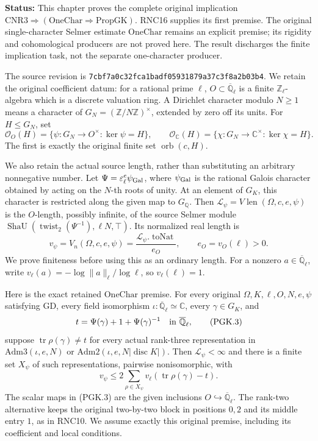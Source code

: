 \documentclass[11pt,a4paper]{article}
\numberwithin{equation}{section}
\theoremstyle{remark}\newtheorem{remark}[theorem]{Remark}
\newcommand{\status}[1]{\textbf{Status:} #1}
\begin{document}
\status{This chapter proves the complete original implication
\(\mathrm{CNR3}\Longrightarrow(\mathrm{OneChar}\Longrightarrow
\mathrm{PropGK})\). RNC16 supplies its first premise. The original
single-character Selmer estimate \(\mathrm{OneChar}\) remains an
explicit premise; its rigidity and cohomological producers are not
proved here. The result discharges the finite implication task,
not the separate one-character producer.}

The source revision is
\texttt{7cbf7a0c32fca1badf05931879a37c3f8a2b03b4}.
We retain the original coefficient datum: for a rational prime
\(\ell\), \(O\subset\overline{\mathbb Q}_\ell\) is a finite
\(\mathbb Z_\ell\)-algebra which is a discrete valuation ring.
A Dirichlet character modulo \(N\ge1\) means a character of
\(G_N=(\mathbb Z/N\mathbb Z)^\times\), extended by zero off its
units. For \(H\le G_N\), set
\[
 \mathcal O_O(H)=\{\psi:G_N\to O^\times:\ker\psi=H\},\qquad
 \mathcal O_{\mathbb C}(H)=
       \{\chi:G_N\to\mathbb C^\times:\ker\chi=H\}.
 \tag{PGK.1}
\]
The first is exactly the original finite set \(\operatorname{orb}(c,H)\).

We also retain the actual source length, rather than substituting
an arbitrary nonnegative number. Let
\(\Psi=\varepsilon_\ell^e\psi_{\rm Gal}\), where
\(\psi_{\rm Gal}\) is the rational Galois character obtained by
acting on the \(N\)-th roots of unity. At an element of \(G_K\),
this character is restricted along the given map to \(G_{\mathbb Q}\).
Then
\(\mathcal L_\psi=V\!\operatorname{len}(\Omega,c,e,\psi)\) is the
\(O\)-length, possibly infinite, of the source Selmer module
\(\operatorname{ShaU}(\operatorname{twist}_2(\Psi^{-1}),\ell N,\top)\).
Its normalized real length is
\[
 v_\psi=V_n(\Omega,c,e,\psi)
       =\frac{\mathcal L_\psi.\operatorname{toNat}}{e_O},
 \qquad e_O=v_O(\ell)>0 .                                      \tag{PGK.2}
\]
We prove finiteness before using this as an ordinary length.
For a nonzero \(a\in\overline{\mathbb Q}_\ell\), write
\(v_\ell(a)=-\log\lVert a\rVert_\ell/\log\ell\), so
\(v_\ell(\ell)=1\).

Here is the exact retained \(\mathrm{OneChar}\) premise. For
every original \(\Omega,K,\ell,O,N,e,\psi\) satisfying
\(\mathrm{GD}\), every field isomorphism
\(\iota:\overline{\mathbb Q}_\ell\simeq\mathbb C\), every
\(\gamma\in G_K\), and
\[
 t=\Psi(\gamma)+1+\Psi(\gamma)^{-1}
                  \quad\hbox{in }\overline{\mathbb Q}_\ell,
 \tag{PGK.3}
\]
suppose \(\operatorname{tr}\rho(\gamma)\ne t\) for every actual
rank-three representation in
\(\mathrm{Adm3}(\iota,e,N)\) or
\(\mathrm{Adm2}(\iota,e,N|\operatorname{disc}K|)\).
Then \(\mathcal L_\psi<\infty\) and there is a finite set
\(X_\psi\) of such representations, pairwise nonisomorphic, with
\[
 v_\psi\le2\sum_{\rho\in X_\psi}
             v_\ell(\operatorname{tr}\rho(\gamma)-t).
 \tag{PGK.4}
\]
The scalar maps in (PGK.3) are the given inclusions
\(O\hookrightarrow\overline{\mathbb Q}_\ell\). The rank-two
alternative keeps the original two-by-two block in positions
\(0,2\) and its middle entry \(1\), as in RNC10. We assume exactly
this original premise, including its coefficient and local conditions.
\end{document}
